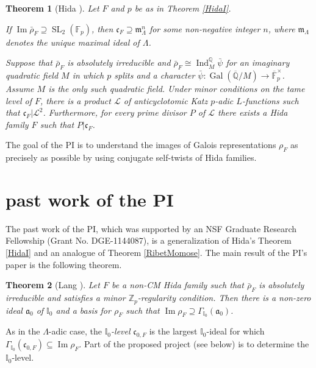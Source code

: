 \documentclass[11pt]{amsart}
\newtheorem{thm}{Theorem}[section]
\theoremstyle{definition}
\theoremstyle{remark}
\def\Aa{\mathfrak{a}}
\def\cc{\mathfrak{c}}
\def\F{\mathbb{F}}
\def\I{\mathbb{I}}
\def\aL{\mathcal{L}}
\def\m{\mathfrak{m}}
\def\Q{\mathbb{Q}}
\def\Z{\mathbb{Z}}
\DeclareMathOperator{\Gal}{Gal}
\DeclareMathOperator{\im}{Im}
\DeclareMathOperator{\Ind}{Ind}
\DeclareMathOperator{\SL}{SL}
\begin{document}
\begin{thm}[Hida \cite{Hida15}]\label{HidaII}
Let $F$ and $p$ be as in Theorem \ref{HidaI}.
\begin{enumerate*}
\item If $\im \bar{\rho}_F \supseteq \SL_2(\F_p)$, then $\cc_F \supseteq \m_\Lambda^n$ for some non-negative integer $n$, where $\m_\Lambda$ denotes the unique maximal ideal of $\Lambda$.

\item\label{Katz case} Suppose that $\bar{\rho}_F$ is absolutely irreducible and $\bar{\rho}_F \cong \Ind_M^\Q \bar{\psi}$ for an imaginary quadratic field $M$ in which $p$ splits and a character $\bar{\psi} : \Gal(\overline{\Q}/M) \to \overline{\F}_p^\times$.  Assume $M$ is the only such quadratic field.  Under minor conditions on the tame level of $F$, there is a product $\aL$ of anticyclotomic Katz $p$-adic $L$-functions such that $\cc_F | \aL^2$.  Furthermore, for every prime divisor $P$ of $\aL$ there exists a Hida family $F$ such that $P | \cc_F$.
\end{enumerate*} 
\end{thm}

The goal of the PI is to understand the images of Galois representations $\rho_F$ as precisely as possible by using conjugate self-twists of Hida families.

\section*{past work of the PI}
The past work of the PI, which was supported by an NSF Graduate Research Fellowship (Grant No. DGE-1144087), is a generalization of Hida's Theorem \ref{HidaI} and an analogue of Theorem \ref{RibetMomose}.  The main result of the PI's paper \cite{Lang15} is the following theorem.

\begin{thm}[Lang \cite{Lang15}]\label{Lang}
Let $F$ be a non-CM Hida family such that $\bar{\rho}_F$ is absolutely irreducible and satisfies a minor $\Z_p$-regularity condition.  Then there is a non-zero ideal $\Aa_0$ of $\I_0$ and a basis for $\rho_F$ such that $\im \rho_F \supseteq \Gamma_{\I_0}(\Aa_0)$.
\end{thm}

As in the $\Lambda$-adic case, the \textit{$\I_0$-level} $\cc_{0,F}$ is the largest $\I_0$-ideal for which $\Gamma_{\I_0}(\cc_{0,F}) \subseteq \im \rho_F$.  Part of the proposed project (see below) is to determine the $\I_0$-level.
\end{document}
